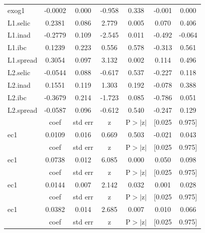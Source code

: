\documentclass[a4paper,
               article,
               12pt,
               openany,
               oneside,
               english,
               brazil]{abntex2}
\numberwithin{equation}{section}
\begin{document}
\begin{longtable}{lcccccc}
    exog1     &      -0.0002  &        0.000     &    -0.958  &         0.338        &       -0.001    &        0.000     \\
    L1.selic  &       0.2381  &        0.086     &     2.779  &         0.005        &        0.070    &        0.406     \\
    L1.inad   &      -0.2779  &        0.109     &    -2.545  &         0.011        &       -0.492    &       -0.064     \\
    L1.ibc    &       0.1239  &        0.223     &     0.556  &         0.578        &       -0.313    &        0.561     \\
    L1.spread &       0.3054  &        0.097     &     3.132  &         0.002        &        0.114    &        0.496     \\
    L2.selic  &      -0.0544  &        0.088     &    -0.617  &         0.537        &       -0.227    &        0.118     \\
    L2.inad   &       0.1551  &        0.119     &     1.303  &         0.192        &       -0.078    &        0.388     \\
    L2.ibc    &      -0.3679  &        0.214     &    -1.723  &         0.085        &       -0.786    &        0.051     \\
    L2.spread &      -0.0587  &        0.096     &    -0.612  &         0.540        &       -0.247    &        0.129     \\
    \toprule
    & coef & std err & z & P$> |$z$|$ & [0.025 & 0.975]  \\
    \midrule
    ec1 &       0.0109  &        0.016     &     0.669  &         0.503        &       -0.021    &        0.043     \\
    & coef & std err & z & P$> |$z$|$ & [0.025 & 0.975]  \\
    \midrule
    ec1 &       0.0738  &        0.012     &     6.085  &         0.000        &        0.050    &        0.098     \\
    & coef & std err & z & P$> |$z$|$ & [0.025 & 0.975]  \\
    \midrule
    ec1 &       0.0144  &        0.007     &     2.142  &         0.032        &        0.001    &        0.028     \\
    & coef & std err & z & P$> |$z$|$ & [0.025 & 0.975]  \\
    \midrule
    ec1 &       0.0382  &        0.014     &     2.685  &         0.007        &        0.010    &        0.066     \\
    & coef & std err & z & P$> |$z$|$ & [0.025 & 0.975]  \\

\end{longtable}
\end{document}
